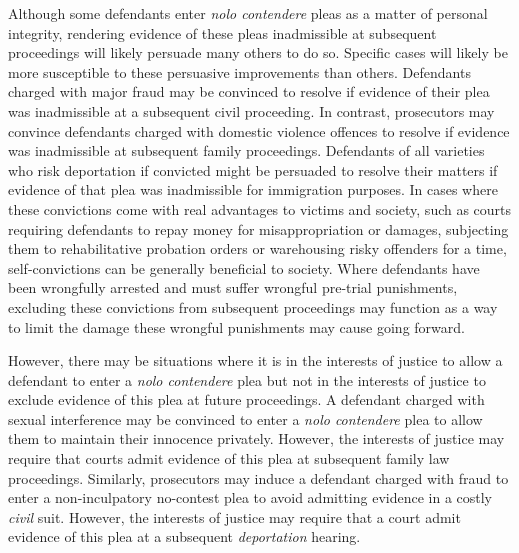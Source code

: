 Although some defendants enter \textit{nolo contendere} pleas as a matter of personal integrity, rendering evidence of these pleas inadmissible at subsequent proceedings will likely persuade many others to do so. Specific cases will likely be more susceptible to these persuasive improvements than others. Defendants charged with major fraud may be convinced to resolve if evidence of their plea was inadmissible at a subsequent civil proceeding. In contrast, prosecutors may convince defendants charged with domestic violence offences to resolve if evidence was inadmissible at subsequent family proceedings. Defendants of all varieties who risk deportation if convicted might be persuaded to resolve their matters if evidence of that plea was inadmissible for immigration purposes. In cases where these convictions come with real advantages to victims and society, such as courts requiring defendants to repay money for misappropriation or damages, subjecting them to rehabilitative probation orders or warehousing risky offenders for a time, self-convictions can be generally beneficial to society. Where defendants have been wrongfully arrested and must suffer wrongful pre-trial punishments, excluding these convictions from subsequent proceedings may function as a way to limit the damage these wrongful punishments may cause going forward.

However, there may be situations where it is in the interests of justice to allow a defendant to enter a \textit{nolo contendere} plea but not in the interests of justice to exclude evidence of this plea at future proceedings. A defendant charged with sexual interference may be convinced to enter a \textit{nolo contendere} plea to allow them to maintain their innocence privately. However, the interests of justice may require that courts admit evidence of this plea at subsequent family law proceedings. Similarly, prosecutors may induce a defendant charged with fraud to enter a non-inculpatory no-contest plea to avoid admitting evidence in a costly \textit{civil} suit. However, the interests of justice may require that a court admit evidence of this plea at a subsequent \textit{deportation} hearing. 

